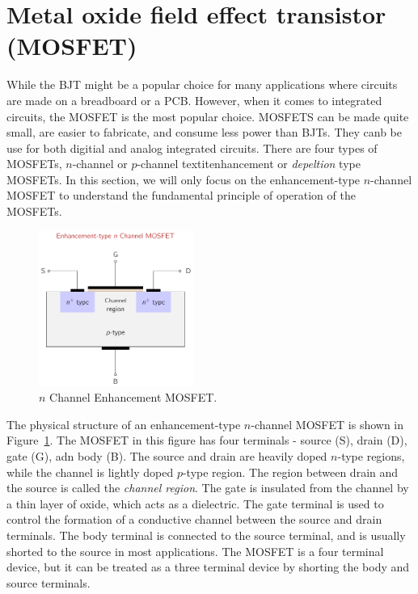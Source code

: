 \section{Metal oxide field effect transistor (MOSFET)}
While the BJT might be a popular choice for many applications where circuits are made on a breadboard or a PCB. However, when it comes to integrated circuits, the MOSFET is the most popular choice. MOSFETS can be made quite small, are easier to fabricate, and consume less power than BJTs. They canb be use for both digitial and analog integrated circuits. There are four types of MOSFETs, $n$-channel or $p$-channel textit{enhancement} or \textit{depeltion} type MOSFETs. In this section, we will only focus on the enhancement-type $n$-channel MOSFET to understand the fundamental principle of operation of the MOSFETs.

\begin{figure}[t]
    \centering
    \includegraphics[width=0.45\textwidth]{figures/ch03/fig03-mosfet-struct.pdf}
    \caption{$n$ Channel Enhancement MOSFET.}
    \label{fig:03-mosfet-struct}
\end{figure}

The physical structure of an enhancement-type $n$-channel MOSFET is shown in Figure~\ref{fig:03-mosfet-struct}. The MOSFET in this figure has four terminals - source (S), drain (D), gate (G), adn body (B). The source and drain are heavily doped $n$-type regions, while the channel is lightly doped $p$-type region. The region between drain and the source is called the \textit{channel region}. The gate is insulated from the channel by a thin layer of oxide, which acts as a dielectric. The gate terminal is used to control the formation of a conductive channel between the source and drain terminals. The body terminal is connected to the source terminal, and is usually shorted to the source in most applications. The MOSFET is a four terminal device, but it can be treated as a three terminal device by shorting the body and source terminals.

